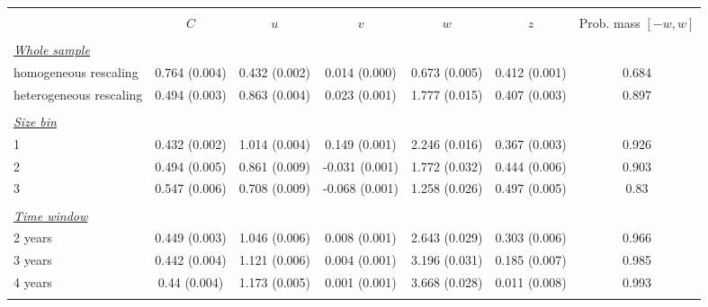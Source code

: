 
\begin{tabular}{@{\extracolsep{5pt}} l cccccc} 
\\[-1.8ex]\hline 
\hline \\[-1.8ex] 
 & $C$ & $u$ & $v$ & $w$ & $z$ & Prob. mass $[-w,w]$ \\ 
\hline \\[-1.8ex] 
\underline{{\it Whole sample}} &   &   &   &   &   &  \\ 
homogeneous rescaling & 0.764 (0.004) & 0.432 (0.002) & 0.014 (0.000) & 0.673 (0.005) & 0.412 (0.001) & 0.684 \\ 
heterogeneous rescaling & 0.494 (0.003) & 0.863 (0.004) & 0.023 (0.001) & 1.777 (0.015) & 0.407 (0.003) & 0.897 \\ 
 &   &   &   &   &   &  \\ 
\underline{{\it Size bin}} &   &   &   &   &   &  \\ 
1 & 0.432 (0.002) & 1.014 (0.004) & 0.149 (0.001) & 2.246 (0.016) & 0.367 (0.003) & 0.926 \\ 
2 & 0.494 (0.005) & 0.861 (0.009) & -0.031 (0.001) & 1.772 (0.032) & 0.444 (0.006) & 0.903 \\ 
3 & 0.547 (0.006) & 0.708 (0.009) & -0.068 (0.001) & 1.258 (0.026) & 0.497 (0.005) & 0.83 \\ 
 &   &   &   &   &   &  \\ 
\underline{{\it Time window}} &   &   &   &   &   &  \\ 
2 years & 0.449 (0.003) & 1.046 (0.006) & 0.008 (0.001) & 2.643 (0.029) & 0.303 (0.006) & 0.966 \\ 
3 years & 0.442 (0.004) & 1.121 (0.006) & 0.004 (0.001) & 3.196 (0.031) & 0.185 (0.007) & 0.985 \\ 
4 years & 0.44 (0.004) & 1.173 (0.005) & 0.001 (0.001) & 3.668 (0.028) & 0.011 (0.008) & 0.993 \\ 
\hline \\[-1.8ex] 
\end{tabular} 
